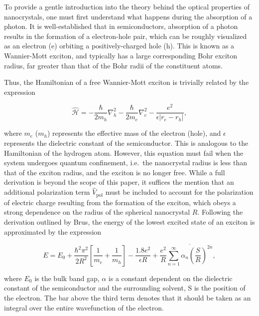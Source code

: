 \documentclass[journal = jceda8, manuscript = article]{achemso}
\newcommand{\hamil}{\hat{\mathcal{H}}}
\begin{document}
To provide a gentle introduction into the theory behind the optical properties
of nanocrystals, one must first understand what happens during the absorption of
a photon. It is well-established that in semiconductors, absorption of a photon
results in the formation of a electron-hole pair, which can be roughly
visualized as an electron (e) orbiting a positively-charged hole (h).
\cite{semiconductor-text, excitons} This is known as a Wannier-Mott exciton, and
typically has a large corresponding Bohr exciton radius, far greater than that
of the Bohr radii of the constituent atoms.

Thus, the Hamiltonian of a free Wannier-Mott exciton is trivially related by the
expression

\begin{equation}
		\hamil = - \frac{\hbar}{2 m_h} \nabla_h^2
		         - \frac{\hbar}{2 m_e} \nabla_e^2
			 - \frac{e^2}{\epsilon |r_e - r_h|},
\end{equation}

where $m_e$ ($m_h$) represents the effective mass of the electron (hole), and
$\epsilon$ represents the dielectric constant of the semiconductor. This is
analogous to the Hamiltonian of the hydrogen atom. However, this equation must
fail when the system undergoes quantum confinement, i.e.\ the nanocrystal radius
is less than that of the exciton radius, and the exciton is no longer free.
While a full derivation is beyond the scope of this paper, it suffices the
mention that an additional polarization term $\hat V_\text{pol}$ must be
included to account for the polarization of electric charge resulting from the
formation of the exciton, which obeys a strong dependence on the radius of the
spherical nanocrystal $R$. Following the derivation outlined by Brus, the energy
of the lowest excited state of an exciton is approximated by the expression
\cite{exciton_energy}

\begin{equation}
E = E_0 + \frac{\hbar^2\pi^2}{2R^2} \left[ \frac{1}{m_e} + \frac{1}{m_h} \right]
    - \frac{1.8 e^2}{\epsilon R}
    + \frac{e^2}{R} \overline{\sum^{\infty}_{n = 1} \alpha_n \left( \frac{S}{R} \right)^{2n}},
\end{equation}

where $E_0$ is the bulk band gap, $\alpha$ is a constant dependent on the
dielectric constant of the semiconductor and the surrounding solvent, S is the
position of the electron. The bar above the third term denotes that it should be
taken as an integral over the entire wavefunction of the electron.
\end{document}
